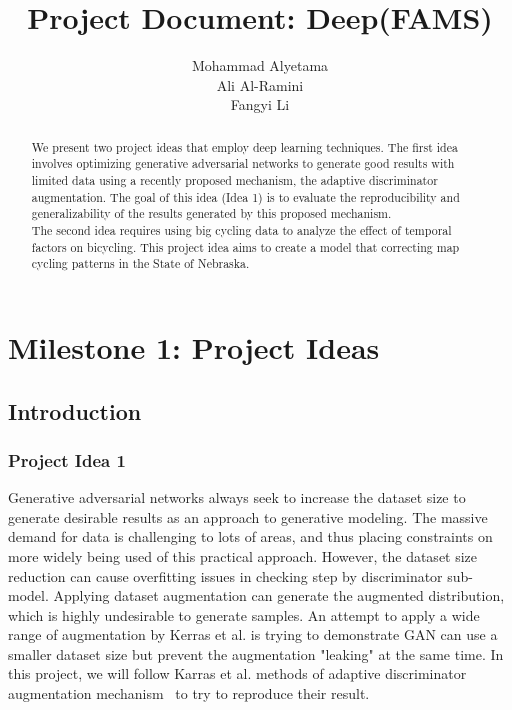 \documentclass{report}
\title{Project Document: Deep(FAMS)}
\author{Mohammad Alyetama \\
Ali Al-Ramini \\
Fangyi Li }
\date{}
\begin{document}
\maketitle

\tableofcontents

\begin{abstract}
We present two project ideas that employ deep learning techniques. The first idea involves optimizing generative adversarial networks to generate good results with limited data using a recently proposed mechanism, the adaptive discriminator augmentation. The goal of this idea (Idea 1) is to evaluate the reproducibility and generalizability of the results generated by this proposed mechanism. \\The second idea requires using big cycling data to analyze the effect of temporal factors on bicycling. This project idea aims to create a model that correcting map cycling patterns in the State of Nebraska.
\end{abstract}

\chapter{Milestone 1: Project Ideas}

\section{Introduction}

\subsection{Project Idea 1}

Generative adversarial networks always seek to increase the dataset size to generate desirable results as an approach to generative modeling. The massive demand for data is challenging to lots of areas, and thus placing constraints on more widely being used of this practical approach. However, the dataset size reduction can cause overfitting issues in checking step by discriminator sub-model. Applying dataset augmentation can generate the augmented distribution, which is highly undesirable to generate samples.
An attempt to apply a wide range of augmentation by Kerras et al. is trying to demonstrate GAN can use a smaller dataset size but prevent the augmentation "leaking" at the same time. In this project, we will follow Karras et al. methods of adaptive discriminator augmentation mechanism~\cite{karras2020training} to try to reproduce their result.
\end{document}
